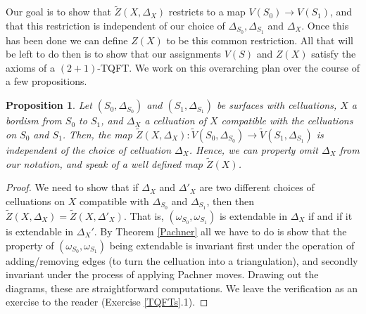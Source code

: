 \documentclass{article}
\newtheorem{proposition}{Proposition}[section]
\theoremstyle{definition}
\numberwithin{figure}{section}
\begin{document}
Our goal is to show that $\tilde{Z}(X,\Delta_{X})$ restricts to a map $V(S_0)\xrightarrow{}V(S_1)$, and that this restriction is independent of our choice of $\Delta_{S_0}, \Delta_{S_1}$ and $\Delta_{X}$. Once this has been done we can define $Z(X)$ to be this common restriction. All that will be left to do then is to show that our assignments $V(S)$ and $Z(X)$ satisfy the axioms of a $(2+1)$-TQFT. We work on this overarching plan over the course of a few propositions.

\begin{proposition}\label{Celluation independent}
Let $(S_0,\Delta_{S_0})$ and $\left(S_1,\Delta_{S_1}\right)$ be surfaces with celluations, $X$ a bordism from $S_0$ to $S_1$, and $\Delta_X$ a celluation of $X$ compatible with the celluations on $S_0$ and $S_1$. Then, the map $\tilde{Z}(X,\Delta_X): \tilde{V}(S_0,\Delta_{S_0})\xrightarrow{}\tilde{V}(S_1,\Delta_{S_1})$ is independent of the choice of celluation $\Delta_X$. Hence, we can properly omit $\Delta_X$ from our notation, and speak of a well defined map $\tilde{Z}(X)$.
\end{proposition}
\begin{proof} We need to show that if $\Delta_X$ and $\Delta'_X$ are two different choices of celluations on $X$ compatible with $\Delta_{S_0}$ and $\Delta_{S_1}$, then then $\tilde{Z}(X,\Delta_X)=\tilde{Z}(X,\Delta'_X)$. That is, $(\omega_{S_0},\omega_{S_1})$ is extendable in $\Delta_X$ if and if it is extendable in $\Delta_X'$. By Theorem \ref{Pachner} all we have to do is show that the property of $(\omega_{S_0},\omega_{S_1})$ being extendable is invariant first under the operation of adding/removing edges (to turn the celluation into a triangulation), and secondly invariant under the process of applying Pachner moves. Drawing out the diagrams, these are straightforward computations. We leave the verification as an exercise to the reader (Exercise \ref{TQFTs}.1).
\end{proof}
\end{document}
